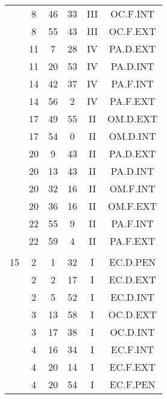 \documentclass[12pt, a4paper]{article}
\begin{document}
\begin{multicols}{3}
{\begin{tabular}{c c c c c c}
	 	 	 	 & 8 & 46 & 33 & III & OC.F.INT\\%
	 	 	 	 & 8 & 55 & 43 & III & OC.F.EXT\\%
	 	 	 	 & 11 & 7 & 28 & IV & PA.D.EXT\\%
	 	 	 	 & 11 & 20 & 53 & IV & PA.D.INT\\%
	 	 	 	 & 14 & 42 & 37 & IV & PA.F.INT\\%
	 	 	 	 & 14 & 56 & 2 & IV & PA.F.EXT\\%
	 	 	 	 & 17 & 49 & 55 & II & OM.D.EXT\\%
	 	 	 	 & 17 & 54 & 0 & II & OM.D.INT\\%
	 	 	 	 & 20 & 9 & 43 & II & PA.D.EXT\\%
	 	 	 	 & 20 & 13 & 43 & II & PA.D.INT\\%
	 	 	 	 & 20 & 32 & 16 & II & OM.F.INT\\%
	 	 	 	 & 20 & 36 & 16 & II & OM.F.EXT\\%
	 	 	 	 & 22 & 55 & 9 & II & PA.F.INT\\%
	 	 	 	 & 22 & 59 & 4 & II & PA.F.EXT\\%
	 	 	 	 & & & & & \\%
	 	 	 	15 & 2 & 1 & 32 & I & EC.D.PEN\\%
	 	 	 	 & 2 & 2 & 17 & I & EC.D.EXT\\%
	 	 	 	 & 2 & 5 & 52 & I & EC.D.INT\\%
	 	 	 	 & 3 & 13 & 58 & I & OC.D.EXT\\%
	 	 	 	 & 3 & 17 & 38 & I & OC.D.INT\\%
	 	 	 	 & 4 & 16 & 34 & I & EC.F.INT\\%
	 	 	 	 & 4 & 20 & 14 & I & EC.F.EXT\\%
	 	 	 	 & 4 & 20 & 54 & I & EC.F.PEN\\%

\end{tabular}}
\end{multicols}
\end{document}
